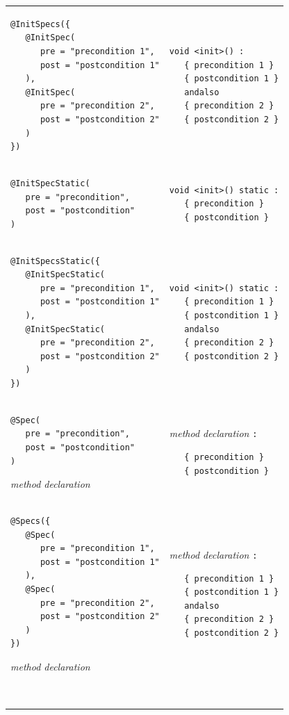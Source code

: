 \documentclass{article}
\begin{document}
\begin{longtable}{ m{7cm} | m{5cm} }
\begin{verbatim}
@InitSpecs({
   @InitSpec(
      pre = "precondition 1", 
      post = "postcondition 1"
   ),
   @InitSpec(
      pre = "precondition 2",
      post = "postcondition 2"
   )
})
\end{verbatim}
&
\begin{verbatim}
void <init>() :
   { precondition 1 }
   { postcondition 1 }
   andalso
   { precondition 2 }
   { postcondition 2 }
\end{verbatim}
\\
\begin{verbatim}
@InitSpecStatic(
   pre = "precondition",
   post = "postcondition"
)
\end{verbatim}
&
\begin{verbatim}
void <init>() static :
   { precondition }
   { postcondition }
\end{verbatim}
\\
\begin{verbatim}
@InitSpecsStatic({
   @InitSpecStatic(
      pre = "precondition 1", 
      post = "postcondition 1"
   ),
   @InitSpecStatic(
      pre = "precondition 2",
      post = "postcondition 2"
   )
})
\end{verbatim}
&
\begin{verbatim}
void <init>() static :
   { precondition 1 }
   { postcondition 1 }
   andalso
   { precondition 2 }
   { postcondition 2 }
\end{verbatim}
\\
\begin{verbatim}
@Spec(
   pre = "precondition", 
   post = "postcondition"
)
\end{verbatim}
\it{method declaration}
&
{\it method declaration} \texttt{:}
\begin{verbatim}
   { precondition }
   { postcondition }
\end{verbatim}
\\
\begin{verbatim}
@Specs({
   @Spec(
      pre = "precondition 1", 
      post = "postcondition 1"
   ),
   @Spec(
      pre = "precondition 2", 
      post = "postcondition 2"
   )
})
\end{verbatim}
\it{method declaration}
&
{\it method declaration} \texttt{:}
\begin{verbatim}
   { precondition 1 }
   { postcondition 1 }
   andalso
   { precondition 2 }
   { postcondition 2 }
\end{verbatim}
\\
\begin{verbatim}

\end{verbatim}
\end{longtable}
\end{document}

